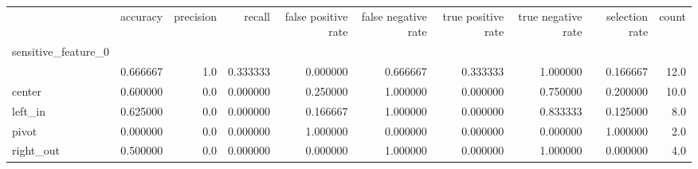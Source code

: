 \begin{tabular}{lrrrrrrrrr}
\toprule
{} &  accuracy &  precision &    recall &  false positive rate &  false negative rate &  true positive rate &  true negative rate &  selection rate &  count \\
sensitive\_feature\_0 &           &            &           &                      &                      &                     &                     &                 &        \\
\midrule
                    &  0.666667 &        1.0 &  0.333333 &             0.000000 &             0.666667 &            0.333333 &            1.000000 &        0.166667 &   12.0 \\
center              &  0.600000 &        0.0 &  0.000000 &             0.250000 &             1.000000 &            0.000000 &            0.750000 &        0.200000 &   10.0 \\
left\_in             &  0.625000 &        0.0 &  0.000000 &             0.166667 &             1.000000 &            0.000000 &            0.833333 &        0.125000 &    8.0 \\
pivot               &  0.000000 &        0.0 &  0.000000 &             1.000000 &             0.000000 &            0.000000 &            0.000000 &        1.000000 &    2.0 \\
right\_out           &  0.500000 &        0.0 &  0.000000 &             0.000000 &             1.000000 &            0.000000 &            1.000000 &        0.000000 &    4.0 \\
\bottomrule
\end{tabular}
